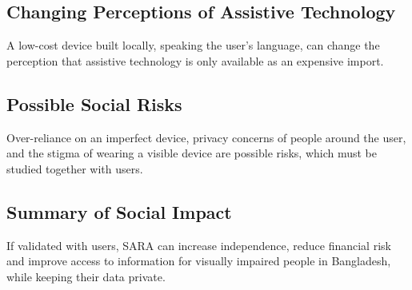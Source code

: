 \subsection{Changing Perceptions of Assistive Technology}
A low-cost device built locally, speaking the user's language, can change the perception that assistive technology is only available as an expensive import.

\subsection{Possible Social Risks}
Over-reliance on an imperfect device, privacy concerns of people around the user, and the stigma of wearing a visible device are possible risks, which must be studied together with users.

\subsection{Summary of Social Impact}
If validated with users, SARA can increase independence, reduce financial risk and improve access to information for visually impaired people in Bangladesh, while keeping their data private.
